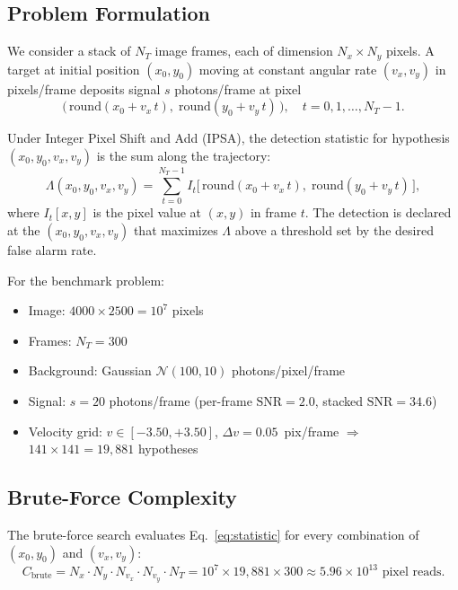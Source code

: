 \documentclass[11pt,letterpaper]{article}
\newcommand{\snr}{\mathrm{SNR}}
\begin{document}
\subsection{Problem Formulation}
\label{sec:formulation}

We consider a stack of $N_T$ image frames, each of dimension $N_x \times N_y$
pixels. A target at initial position $(x_0, y_0)$ moving at constant angular
rate $(v_x, v_y)$ in pixels/frame deposits signal $s$ photons/frame at pixel
\begin{equation}
    \bigl(\,\mathrm{round}(x_0 + v_x\, t),\;\mathrm{round}(y_0 + v_y\, t)\,\bigr),
    \quad t = 0, 1, \ldots, N_T - 1.
    \label{eq:trajectory}
\end{equation}

Under Integer Pixel Shift and Add (IPSA), the detection statistic for
hypothesis $(x_0, y_0, v_x, v_y)$ is the sum along the trajectory:
\begin{equation}
    \Lambda(x_0, y_0, v_x, v_y)
    = \sum_{t=0}^{N_T - 1} I_t\!\bigl[\,\mathrm{round}(x_0 + v_x\, t),\;
      \mathrm{round}(y_0 + v_y\, t)\,\bigr],
    \label{eq:statistic}
\end{equation}
where $I_t[x,y]$ is the pixel value at $(x,y)$ in frame $t$. The detection
is declared at the $(x_0, y_0, v_x, v_y)$ that maximizes $\Lambda$ above
a threshold set by the desired false alarm rate.

For the benchmark problem:
\begin{itemize}[nosep]
    \item Image: $4000 \times 2500 = 10^7$ pixels
    \item Frames: $N_T = 300$
    \item Background: Gaussian $\mathcal{N}(100, 10)$ photons/pixel/frame
    \item Signal: $s = 20$ photons/frame (per-frame $\snr = 2.0$,
          stacked $\snr = 34.6$)
    \item Velocity grid: $v \in [-3.50, +3.50]$, $\Delta v = 0.05$~pix/frame
          $\Rightarrow$ $141 \times 141 = 19{,}881$ hypotheses
\end{itemize}

\subsection{Brute-Force Complexity}

The brute-force search evaluates Eq.~\eqref{eq:statistic} for every
combination of $(x_0, y_0)$ and $(v_x, v_y)$:
\begin{equation}
    C_{\text{brute}} = N_x \cdot N_y \cdot N_{v_x} \cdot N_{v_y} \cdot N_T
    = 10^7 \times 19{,}881 \times 300
    \approx 5.96 \times 10^{13} \text{ pixel reads}.
    \label{eq:brute_complexity}
\end{equation}
\end{document}
